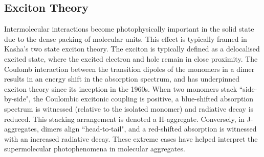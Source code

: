 \subsection{Exciton Theory}\label{section: lom intermolecular-interactions}
Intermolecular interactions become photophysically important in the solid state due to the dense packing of molecular units. This effect is typically framed in Kasha's two state exciton theory.\cite{Gierschner2009,Gierschner2013,Gierschner2013a,Hestand2017,Shi2017} The exciton is typically defined as a delocalised excited state, where the excited electron and hole remain in close proximity. The Coulomb interaction between the transition dipoles of the monomers in a dimer results in an energy shift in the absorption spectrum, and has underpinned exciton theory since its inception in the 1960s.\cite{Kasha1965a} When two monomers stack ``side-by-side", the Coulombic excitonic coupling is positive, a blue-shifted absorption spectrum is witnessed (relative to the isolated monomer) and radiative decay is reduced. This stacking arrangement is denoted a H-aggregate. Conversely, in J-aggregates, dimers align ``head-to-tail", and a red-shifted absorption is witnessed with an increased radiative decay. These extreme cases have helped interpret the supermolecular photophenomena in molecular aggregates.

